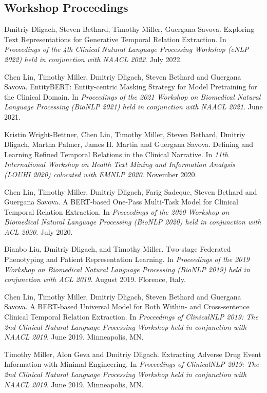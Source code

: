 \documentclass[letterpaper]{article}
\renewenvironment{itemize}{
  \begin{list}{}{
    \setlength{\leftmargin}{1.5em}
  }
}{
  \end{list}
}
\begin{document}
\subsection*{Workshop Proceedings}

\begin{itemize}
\item Dmitriy Dligach, Steven Bethard, Timothy Miller, Guergana Savova. Exploring Text Representations for Generative Temporal Relation Extraction. In \emph{Proceedings of the 4th Clinical Natural Language Processing Workshop (cNLP 2022) held in conjunction with NAACL 2022}. July 2022.
\item Chen Lin, Timothy Miller, Dmitriy Dligach, Steven Bethard and Guergana Savova. EntityBERT: Entity-centric Masking Strategy for Model Pretraining for the Clinical Domain. In \emph{Proceedings of the 2021 Workshop on Biomedical Natural Language Processing (BioNLP 2021) held in conjunction with NAACL 2021}. June 2021.
\item Kristin Wright-Bettner, Chen Lin, Timothy Miller, Steven Bethard, Dmitriy Dligach, Martha Palmer, James H. Martin and Guergana Savova. Defining and Learning Refined Temporal Relations in the Clinical Narrative. In \emph{11th International Workshop on Health Text Mining and Information Analysis (LOUHI 2020) colocated with EMNLP 2020}. November 2020.
\item Chen Lin, Timothy Miller, Dmitriy Dligach, Farig Sadeque, Steven Bethard and Guergana Savova. A BERT-based One-Pass Multi-Task Model for Clinical Temporal Relation Extraction. In \emph{Proceedings of the 2020 Workshop on Biomedical Natural Language Processing (BioNLP 2020) held in conjunction with ACL 2020}. July 2020.
\item Dianbo Liu, Dmitriy Dligach, and Timothy Miller. Two-stage Federated Phenotyping and Patient Representation Learning. In \emph{Proceedings of the 2019 Workshop on Biomedical Natural Language Processing (BioNLP 2019) held in conjunction with ACL 2019}. August 2019. Florence, Italy.
\item Chen Lin, Timothy Miller, Dmitriy Dligach, Steven Bethard and Guergana Savova. A BERT-based Universal Model for Both Within- and Cross-sentence Clinical Temporal Relation Extraction. In \emph{Proceedings of ClinicalNLP 2019: The 2nd Clinical Natural Language Processing Workshop held in conjunction with NAACL 2019}. June 2019. Minneapolis, MN.
\item Timothy Miller, Alon Geva and Dmitriy Dligach. Extracting Adverse Drug Event Information with Minimal Engineering. In \emph{Proceedings of ClinicalNLP 2019: The 2nd Clinical Natural Language Processing Workshop held in conjunction with NAACL 2019}. June 2019. Minneapolis, MN.

\end{itemize}
\end{document}
